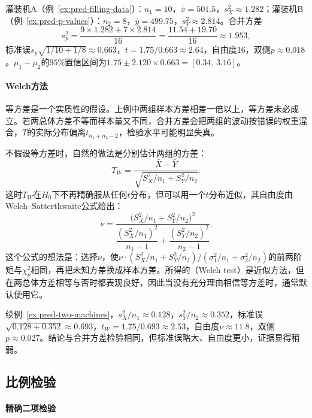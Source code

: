 \begin{example}[两台灌装机的比较]
\label{ex:pred-two-machines}
灌装机A（例~\ref{ex:pred-filling-data}）：$n_1=10$，$\bar x=501.5$，$s_X^2\approx1.282$；灌装机B（例~\ref{ex:pred-p-values}）：$n_2=8$，$\bar y=499.75$，$s_Y^2\approx2.814$。合并方差
\[
 s_p^2=\frac{9\times1.282+7\times2.814}{16}=\frac{11.54+19.70}{16}\approx1.953,
\]
标准误$s_p\sqrt{1/10+1/8}\approx0.663$，$t=1.75/0.663\approx2.64$，自由度$16$，双侧$p\approx0.018$。$\mu_1-\mu_2$的$95\%$置信区间为$1.75\pm2.120\times0.663=[0.34,\,3.16]$。
\end{example}

\paragraph{Welch方法}

等方差是一个实质性的假设。上例中两组样本方差相差一倍以上，等方差未必成立。若两总体方差不等而样本量又不同，合并方差会把两组的波动按错误的权重混合，$T$的实际分布偏离$t_{n_1+n_2-2}$，检验水平可能明显失真。

不假设等方差时，自然的做法是分别估计两组的方差：
\[
 T_W=\frac{\bar X-\bar Y}{\sqrt{S_X^2/n_1+S_Y^2/n_2}}.
\]
这时$T_W$在$H_0$下不再精确服从任何$t$分布，但可以用一个$t$分布近似，其自由度由Welch--Satterthwaite公式给出：
\[
 \nu=\frac{\bigl(S_X^2/n_1+S_Y^2/n_2\bigr)^2}{\dfrac{(S_X^2/n_1)^2}{n_1-1}+\dfrac{(S_Y^2/n_2)^2}{n_2-1}}.
\]
这个公式的想法是：选择$\nu$，使$\nu\cdot(S_X^2/n_1+S_Y^2/n_2)/(\sigma_1^2/n_1+\sigma_2^2/n_2)$的前两阶矩与$\chi^2_\nu$相同，再把未知方差换成样本方差。所得的（Welch test）是近似方法，但在两总体方差相等与否时都表现良好，因此当没有充分理由相信等方差时，通常默认使用它。

\begin{example}[两台灌装机的Welch检验]
\label{ex:pred-welch}
续例~\ref{ex:pred-two-machines}，$s_X^2/n_1\approx0.128$，$s_Y^2/n_2\approx0.352$，标准误$\sqrt{0.128+0.352}\approx0.693$，$t_W=1.75/0.693\approx2.53$，自由度$\nu\approx11.8$，双侧$p\approx0.027$。结论与合并方差检验相同，但标准误略大、自由度更小，证据显得稍弱。
\end{example}

\subsection{比例检验}

\paragraph{精确二项检验}

